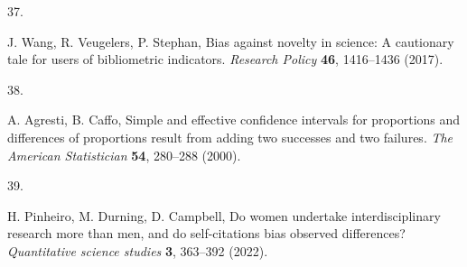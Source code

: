 \documentclass[
  12pt,
]{article}
\newlength{\cslhangindent}
\newlength{\csllabelwidth}
\newenvironment{CSLReferences}[2] %
 {\begin{list}{}{%
  \setlength{\itemindent}{0pt}
  \setlength{\leftmargin}{0pt}
  \setlength{\parsep}{0pt}
  \ifodd #1
   \setlength{\leftmargin}{\cslhangindent}
   \setlength{\itemindent}{-1\cslhangindent}
  \fi
  \setlength{\itemsep}{#2\baselineskip}}}
 {\end{list}}
\newcommand{\CSLLeftMargin}[1]{\parbox[t]{\csllabelwidth}{\strut#1\strut}}
\newcommand{\CSLRightInline}[1]{\parbox[t]{\linewidth - \csllabelwidth}{\strut#1\strut}}
\begin{document}
\begin{CSLReferences}{0}{1}
\CSLLeftMargin{37. }%
\CSLRightInline{J. Wang, R. Veugelers, P. Stephan, Bias against novelty in science: A cautionary tale for users of bibliometric indicators. \emph{Research Policy} \textbf{46}, 1416--1436 (2017).}

\CSLLeftMargin{38. }%
\CSLRightInline{A. Agresti, B. Caffo, Simple and effective confidence intervals for proportions and differences of proportions result from adding two successes and two failures. \emph{The American Statistician} \textbf{54}, 280--288 (2000).}

\CSLLeftMargin{39. }%
\CSLRightInline{H. Pinheiro, M. Durning, D. Campbell, Do women undertake interdisciplinary research more than men, and do self-citations bias observed differences? \emph{Quantitative science studies} \textbf{3}, 363--392 (2022).}

\end{CSLReferences}
\end{document}
